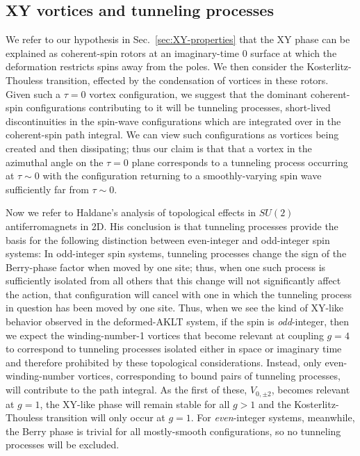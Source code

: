 \documentclass[aps,prb,letterpaper,superscriptaddress,twocolumn,showpacs,floatfix,10pt]{revtex4-1}
\begin{document}
\subsection{XY vortices and tunneling processes}
We refer to our hypothesis in Sec.~\ref{sec:XY-properties} that the XY phase
can be explained as coherent-spin rotors at an imaginary-time 0 surface at which
the deformation restricts spins away from the poles.
We then consider the Kosterlitz-Thouless transition,
effected by the condensation of vortices in these rotors.
Given such a $\tau=0$ vortex
configuration, we suggest that the dominant coherent-spin configurations
contributing to it will be tunneling processes, short-lived discontinuities in
the spin-wave configurations which are integrated over in the coherent-spin path
integral. We can view such configurations as vortices being created and then
dissipating; thus our claim is that that a vortex in the azimuthal angle
on the $\tau=0$ plane corresponds to a tunneling process occurring at
$\tau\sim 0$ with the configuration returning to a smoothly-varying spin wave
sufficiently far from $\tau\sim 0$.

Now we refer to Haldane's analysis\cite{Haldane2D} of topological effects in
$SU(2)$ antiferromagnets in 2D. His conclusion is that tunneling processes
provide the basis for the following distinction between even-integer and
odd-integer spin systems: In odd-integer spin systems, tunneling processes
change the sign of the Berry-phase factor when moved by one site; thus,
when one such process is sufficiently isolated from all others that this
change will not significantly affect the action, that configuration will cancel
with one in which the tunneling process in question has been moved by one site.
Thus, when we see the kind of XY-like behavior observed in the deformed-AKLT
system, if the spin is \textit{odd}-integer, then we expect the winding-number-1
vortices that become relevant at coupling $g=4$ to correspond to tunneling
processes isolated either in space or imaginary time and therefore prohibited
by these topological considerations. Instead, only even-winding-number vortices,
corresponding to bound pairs of tunneling processes, will contribute to the
path integral. As the first of these, $V_{0,\pm 2}$, becomes relevant at
$g = 1$, the XY-like phase will remain stable for all $g>1$ and the
Kosterlitz-Thouless transition will only occur at $g=1$. For
\textit{even}-integer systems, meanwhile, the Berry phase is trivial for
all mostly-smooth configurations, so no tunneling processes will be excluded.
\end{document}
